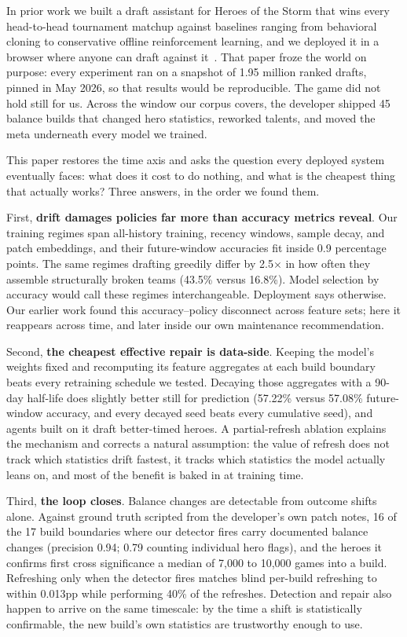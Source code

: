 \documentclass[journal]{IEEEtran}
\begin{document}
In prior work we built a draft assistant for Heroes of the Storm that wins
every head-to-head tournament matchup against baselines ranging from
behavioral cloning to conservative offline reinforcement learning, and we
deployed it in a browser where anyone can draft against
it~\cite{paper1}. That paper froze the world on purpose: every experiment
ran on a snapshot of 1.95 million ranked drafts, pinned in May 2026, so
that results would be reproducible. The game did not hold still for us.
Across the window our corpus covers, the developer shipped 45 balance
builds that changed hero statistics, reworked talents, and moved the meta
underneath every model we trained.

This paper restores the time axis and asks the question every deployed
system eventually faces: what does it cost to do nothing, and what is the
cheapest thing that actually works? Three answers, in the order we found
them.

First, \textbf{drift damages policies far more than accuracy metrics
reveal}. Our training regimes span all-history training, recency windows,
sample decay, and patch embeddings, and their future-window accuracies fit
inside 0.9 percentage points. The same regimes drafting greedily differ by
2.5$\times$ in how often they assemble structurally broken teams (43.5\%
versus 16.8\%). Model selection by accuracy would call these regimes
interchangeable. Deployment says otherwise. Our earlier work found this
accuracy--policy disconnect across feature sets; here it reappears across
time, and later inside our own maintenance recommendation.

Second, \textbf{the cheapest effective repair is data-side}. Keeping the
model's weights fixed and recomputing its feature aggregates at each build
boundary beats every retraining schedule we tested. Decaying those
aggregates with a 90-day half-life does slightly better still for
prediction (57.22\% versus 57.08\% future-window accuracy, and every
decayed seed beats every cumulative seed), and agents built on it draft
better-timed heroes. A partial-refresh ablation
explains the mechanism and corrects a natural assumption: the value of
refresh does not track which statistics drift fastest, it tracks which
statistics the model actually leans on, and most of the benefit is baked
in at training time.

Third, \textbf{the loop closes}. Balance changes are detectable from
outcome shifts alone. Against ground truth scripted from the developer's
own patch notes, 16 of the 17 build boundaries where our detector fires
carry documented balance changes (precision 0.94; 0.79 counting
individual hero flags), and the heroes it confirms first cross
significance a median of 7{,}000 to 10{,}000 games into a build.
Refreshing only when the detector fires
matches blind per-build refreshing to within 0.013pp while performing
40\% of the refreshes. Detection and repair also happen to arrive on the
same timescale: by the time a shift is statistically confirmable, the new
build's own statistics are trustworthy enough to use.
\end{document}
